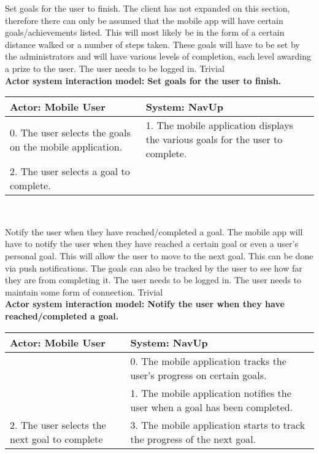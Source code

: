 \FuncReq
{Set goals for the user to finish.}
{The client has not expanded on this section, therefore there can only be assumed that the mobile app will have certain goals/achievements listed. This will most likely be in the form of a certain distance walked or a number of steps taken. These goals will have to be set by the administrators and will have various levels of completion, each level awarding a prize to the user.}
{The user needs to be logged in.}
{Trivial}
\\
\textbf{Actor system interaction model: Set goals for the user to finish.}\\
\begin{tabular}{ | p{6cm} | p{6cm} |}
\hline
Actor: Mobile User & System: NavUp \\ \hline
0. The user selects the goals on the mobile application. & 1. The mobile application displays the various goals for the user to complete.\\ \hline
2. The user selects a goal to complete. &\\ \hline
\end{tabular}
\\
\bigskip

\FuncReq
{Notify the user when they have reached/completed a goal.}
{The mobile app will have to notify the user when they have reached a certain goal or even a user's personal goal. This will allow the user to move to the next goal. This can be done via push notifications. The goals can also be tracked by the user to see how far they are from completing it.}
{The user needs to be logged in.
The user needs to maintain some form of connection.}
{Trivial}
\\
\textbf{Actor system interaction model: Notify the user when they have reached/completed a goal.}\\
\begin{tabular}{ | p{6cm} | p{6cm} |}
\hline
Actor: Mobile User & System: NavUp \\ \hline
& 0. The mobile application tracks the user's progress on certain goals.\\ \hline
& 1. The mobile application notifies the user when a goal has been completed.\\ \hline
2. The user selects the next goal to complete & 3. The mobile application starts to track the progress of the next goal.\\ \hline
\end{tabular}
\\
\bigskip

